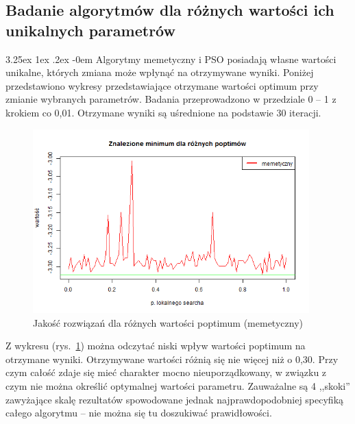 \documentclass[11pt, a4paper]{article}
\makeatletter
\newcommand{\fbi}{\leavevmode{\parindent=1em\indent}}
\renewcommand\paragraph{\@startsection{paragraph}{5}{\z@}
  {3.25ex \@plus1ex \@minus.2ex}
  {-0em}
  {\normalfont\normalsize\bfseries}}
\makeatother
\begin{document}
\subsection{Badanie algorytmów dla różnych wartości ich unikalnych parametrów}
\paragraph{}
Algorytmy memetyczny i PSO posiadają własne wartości unikalne, których zmiana może wpłynąć na otrzymywane wyniki. Poniżej przedstawiono wykresy przedstawiające otrzymane wartości optimum przy zmianie wybranych parametrów. Badania przeprowadzono w przedziale 0 -- 1 z krokiem co 0,01. Otrzymane wyniki są uśrednione na podstawie 30 iteracji.

\begin{figure}[H]
	\centering
	\includegraphics[width=0.95\textwidth]{./assets/Hartman6poptim.png}
	\caption{Jakość rozwiązań dla różnych wartości poptimum (memetyczny)}
	\label{fig:hybridpoptimum}
\end{figure}

\fbi
Z wykresu (rys.~\ref{fig:hybridpoptimum}) można odczytać niski wpływ wartości poptimum na otrzymane wyniki. Otrzymywane wartości różnią się nie więcej niż o 0,30. Przy czym całość zdaje się mieć charakter mocno nieuporządkowany, w związku z czym nie można określić optymalnej wartości parametru. Zauważalne są 4 ,,skoki'' zawyżające skalę rezultatów spowodowane jednak najprawdopodobniej specyfiką całego algorytmu -- nie można się tu doszukiwać prawidłowości.
\end{document}
